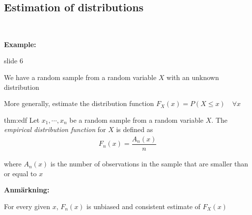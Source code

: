 \subsection{Estimation of distributions}\hfill\\\par
\noindent\textbf{Example:}\par
slide 6\par
\noindent We have a random sample from a random variable $X$ with an unknown distribution\par
\noindent More generally, estimate the distribution function $F_X(x) = P(X\leq x)\quad\forall x$ 
\par\bigskip
\begin{theo}{thm:edf}
  Let $x_1,\cdots,x_n$ be a random sample from a random variable $X$. The \textit{empirical distribution function} for $X$ is defined as 
  \begin{equation*}
    \begin{gathered}
      F_n(x) = \dfrac{A_n(x)}{n}
    \end{gathered}
  \end{equation*}
  \par\bigskip
  \noindent where $A_n(x)$ is the number of observations in the sample that are smaller than or equal to $x$
\end{theo}
\par\bigskip
\noindent\textbf{Anmärkning:}\par
\noindent For every given $x$, $F_n(x)$ is unbiased and consistent estimate of $F_X(x)$
